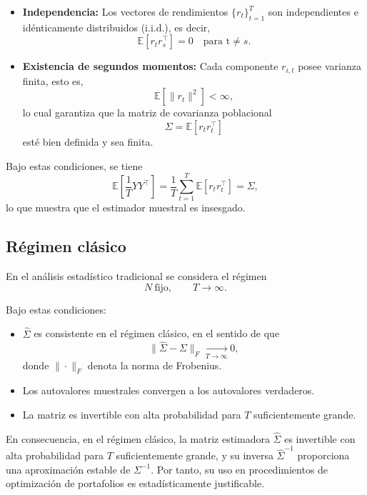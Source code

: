 \documentclass[letterpaper,12pt,oneside]{book}
\begin{document}
\begin{itemize}
    \item \textbf{Independencia:} Los vectores de rendimientos 
    $\{r_t\}_{t=1}^T$ son independientes e idénticamente distribuidos (i.i.d.), es decir,
    \[
    \mathbb{E}[r_t r_s^\top] = 0 \quad \text{para t} \neq s.
    \]
    
    \item \textbf{Existencia de segundos momentos:} Cada componente $r_{i,t}$ posee varianza finita, esto es,
    \[
    \mathbb{E}[\|r_t\|^2] < \infty,
    \]
    lo cual garantiza que la matriz de covarianza poblacional
    \[
    \Sigma = \mathbb{E}[r_t r_t^\top]
    \]
    esté bien definida y sea finita.
\end{itemize}

Bajo estas condiciones, se tiene
\[
\mathbb{E}\!\left[\frac{1}{T}YY^\top\right]
=
\frac{1}{T}\sum_{t=1}^T \mathbb{E}[r_t r_t^\top]
=
\Sigma,
\]
lo que muestra que el estimador muestral es insesgado.

\subsection*{Régimen clásico}

En el análisis estadístico tradicional se considera el régimen
\[
N \ \text{fijo}, \qquad T \to \infty.
\]

Bajo estas condiciones:

\begin{itemize}
    \item $\widehat{\Sigma}$ es consistente en el régimen clásico, en el sentido de que
\[
\|\widehat{\Sigma} - \Sigma\|_F \xrightarrow[T \to \infty]{} 0,
\]
donde $\|\cdot\|_F$ denota la norma de Frobenius.
    
    \item Los autovalores muestrales convergen a los autovalores verdaderos.
    
    \item La matriz es invertible con alta probabilidad para $T$ suficientemente grande.
\end{itemize}

En consecuencia, en el régimen clásico, la matriz estimadora $\widehat{\Sigma}$ es invertible con alta probabilidad para $T$ suficientemente grande, y su inversa $\widehat{\Sigma}^{-1}$ proporciona una aproximación estable de $\Sigma^{-1}$. Por tanto, su uso en procedimientos de optimización de portafolios es estadísticamente justificable.
\end{document}
